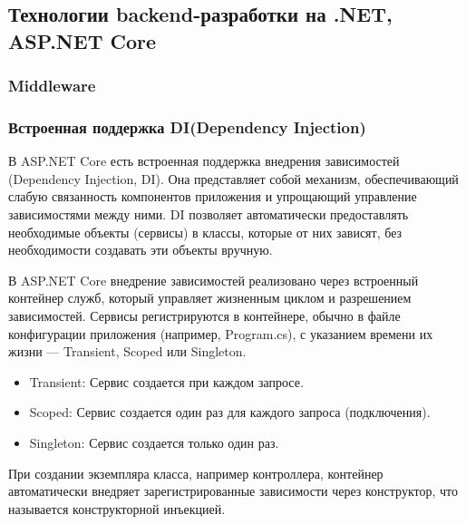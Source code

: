 \subsection{Технологии backend-разработки на .NET, ASP.NET Core}

\subsubsection{Middleware}

\subsubsection{Встроенная поддержка DI(Dependency Injection)}
В ASP.NET Core есть встроенная поддержка внедрения зависимостей (Dependency Injection, DI). Она представляет собой механизм, обеспечивающий слабую связанность компонентов приложения и упрощающий управление зависимостями между ними. DI позволяет автоматически предоставлять необходимые объекты (сервисы) в классы, которые от них зависят, без необходимости создавать эти объекты вручную.

В ASP.NET Core внедрение зависимостей реализовано через встроенный контейнер служб, который управляет жизненным циклом и разрешением зависимостей. Сервисы регистрируются в контейнере, обычно в файле конфигурации приложения (например, Program.cs), с указанием времени их жизни --- Transient,  Scoped или Singleton. 

\begin{itemize}
	\item{Transient: Сервис создается при каждом запросе.}
	\item{Scoped: Сервис создается один раз для каждого запроса (подключения).}
	\item{Singleton: Сервис создается только один раз.}
\end{itemize}

При создании экземпляра класса, например контроллера, контейнер автоматически внедряет зарегистрированные зависимости через конструктор, что называется конструкторной инъекцией.
